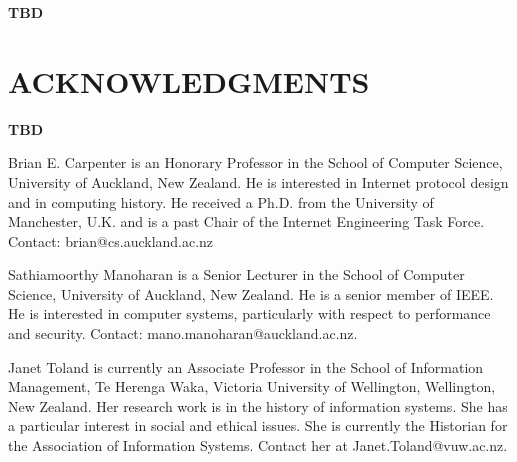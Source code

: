 \documentclass{IEEEcsmag}
\begin{document}
{\bf TBD}

\vspace*{-8pt}
\section{ACKNOWLEDGMENTS}

{\bf TBD}




\begin{IEEEbiography}{Brian E. Carpenter} is an Honorary Professor in the School of Computer Science, University of Auckland, New Zealand. He is interested in Internet protocol design and in computing history. He received a Ph.D. from the University of Manchester, U.K. and is a past Chair of the Internet Engineering Task Force. Contact: brian@cs.auckland.ac.nz\vspace*{8pt}
\end{IEEEbiography}

\begin{IEEEbiography}{Sathiamoorthy Manoharan} is a Senior Lecturer in the School of Computer Science, University of Auckland, New Zealand.
He is a senior member of IEEE. He is interested in computer systems, particularly with respect to performance and security. Contact: mano.manoharan@auckland.ac.nz.\vspace*{8pt}
\end{IEEEbiography}

\begin{IEEEbiography}{Janet Toland} is currently an Associate Professor in the
School of Information Management, Te Herenga Waka, Victoria
University of Wellington, Wellington, New Zealand. Her
research work is in the history of information systems. She
has a particular interest in social and ethical issues. She is
currently the Historian for the Association of Information
Systems. Contact her at Janet.Toland@vuw.ac.nz.\vspace*{8pt}
\end{IEEEbiography}
\end{document}
